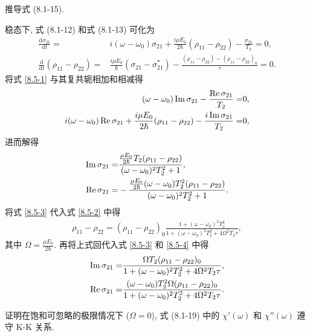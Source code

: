\documentclass{note}
\begin{document}
\begin{exe}
    推导式 (8.1-15).
\end{exe}
\begin{pf}
    稳态下, 式 (8.1-12) 和式 (8.1-13) 可化为
    \begin{align}
        \label{8.5-1}
        \frac{\mathrm{d}\sigma_{21}}{\mathrm{d}t}=&i(\omega-\omega_0)\sigma_{21}+\frac{i\mu E_0}{2\hbar}(\rho_{11}-\rho_{22})-\frac{\sigma_{21}}{T_2}=0,\\
        \label{8.5-2}
        \frac{\mathrm{d}}{\mathrm{d}t}(\rho_{11}-\rho_{22})=&\frac{i\mu E_0}{\hbar}(\sigma_{21}-\sigma_{21}^*)-\frac{(\rho_{11}-\rho_{22})-(\rho_{11}-\rho_{22})_0}{\tau}=0.
    \end{align}
    将式 \eqref{8.5-1} 与其复共轭相加和相减得
    \begin{align}
        (\omega-\omega_0)\operatorname{Im}\sigma_{21}-\frac{\operatorname{Re}\sigma_{21}}{T_2}=&0,\\
        i(\omega-\omega_0)\operatorname{Re}\sigma_{21}+\frac{i\mu E_0}{2\hbar}(\rho_{11}-\rho_{22})-\frac{i\operatorname{Im}\sigma_{21}}{T_2}=&0,
    \end{align}
    进而解得
    \begin{align}
        \label{8.5-3}
        \operatorname{Im}\sigma_{21}=&\frac{\frac{\mu E_0}{2\hbar}T_2(\rho_{11}-\rho_{22})}{(\omega-\omega_0)^2T_2^2+1},\\
        \label{8.5-4}
        \operatorname{Re}\sigma_{21}=&-\frac{\frac{\mu E_0}{2\hbar}(\omega-\omega_0)T_2^2(\rho_{11}-\rho_{22})}{(\omega-\omega_0)^2T_2^2+1}.
    \end{align}
    将式 \eqref{8.5-3} 代入式 \eqref{8.5-2} 中得
    \begin{align}
        \rho_{11}-\rho_{22}=(\rho_{11}-\rho_{22})_0\frac{1+(\omega-\omega_0)^2T_2^2}{1+(\omega-\omega_0)^2T_2^2+4\Omega^2T_2\tau},
    \end{align}
    其中 $\Omega=\frac{\mu E_0}{2\hbar}$.
    再将上式回代入式 \eqref{8.5-3} 和 \eqref{8.5-4} 中得
    \begin{align}
        \operatorname{Im}\sigma_{21}=&\frac{\Omega T_2(\rho_{11}-\rho_{22})_0}{1+(\omega-\omega_0)^2T_2^2+4\Omega^2T_2\tau},\\
        \operatorname{Re}\sigma_{21}=&\frac{(\omega-\omega_0)T_2^2\Omega(\rho_{11}-\rho_{22})_0}{1+(\omega-\omega_0)^2T_2^2+4\Omega^2T_2\tau}.
    \end{align}
\end{pf}

\begin{exe}
    证明在饱和可忽略的极限情况下 ($\Omega=0$), 式 (8.1-19) 中的 $\chi'(\omega)$ 和 $\chi''(\omega)$ 遵守 K-K 关系.
\end{exe}
\begin{pf}
    
\end{pf}
\ifx\allfiles\undefined
\end{document}
